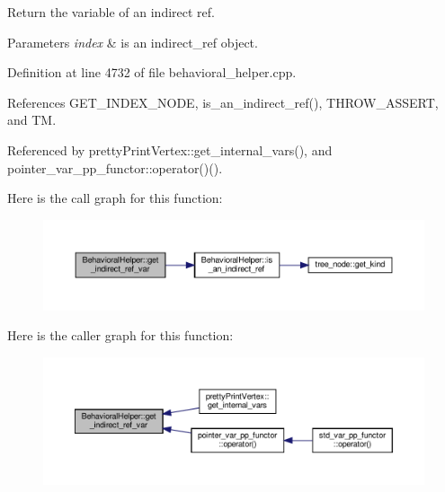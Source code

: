 Return the variable of an indirect ref. 


\begin{DoxyParams}{Parameters}
{\em index} & is an indirect\+\_\+ref object. \\
\hline
\end{DoxyParams}


Definition at line 4732 of file behavioral\+\_\+helper.\+cpp.



References G\+E\+T\+\_\+\+I\+N\+D\+E\+X\+\_\+\+N\+O\+DE, is\+\_\+an\+\_\+indirect\+\_\+ref(), T\+H\+R\+O\+W\+\_\+\+A\+S\+S\+E\+RT, and TM.



Referenced by pretty\+Print\+Vertex\+::get\+\_\+internal\+\_\+vars(), and pointer\+\_\+var\+\_\+pp\+\_\+functor\+::operator()().

Here is the call graph for this function\+:
\nopagebreak
\begin{figure}[H]
\begin{center}
\leavevmode
\includegraphics[width=350pt]{dd/db2/classBehavioralHelper_a810664b0f87645d004da4848ef574974_cgraph}
\end{center}
\end{figure}
Here is the caller graph for this function\+:
\nopagebreak
\begin{figure}[H]
\begin{center}
\leavevmode
\includegraphics[width=350pt]{dd/db2/classBehavioralHelper_a810664b0f87645d004da4848ef574974_icgraph}
\end{center}
\end{figure}
\mbox{\label{classBehavioralHelper_a391009a10b8b6ff6ca10168f19a2a56d}} 
